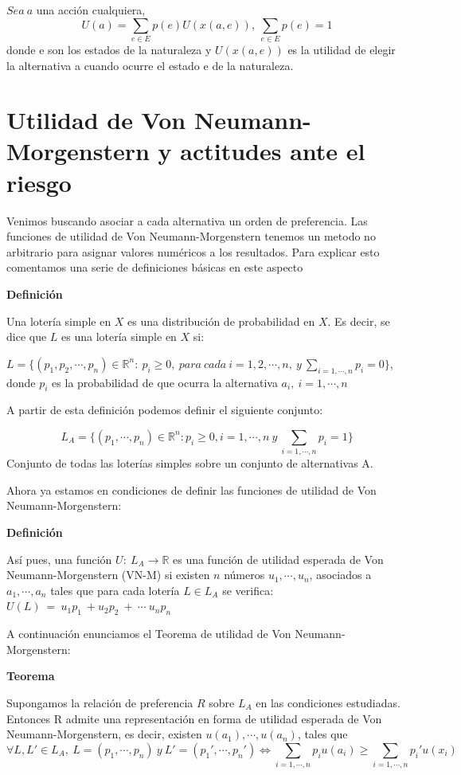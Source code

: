 \documentclass[12pt,a4paper,]{book}
\numberwithin{dummy}{section}
\theoremstyle{ocrenumbox}
\theoremstyle{blacknumex}
\theoremstyle{blacknumbox}
\theoremstyle{ocrenum}
\theoremstyle{ocrenum}
\begin{document}
\(Sea \ a\) una acción cualquiera,
\[U(a) = \sum_{e \in E} p(e)U(x(a,e)), \ \sum_{e \in E} p(e)=1\] donde e
son los estados de la naturaleza y \(U(x(a,e))\) es la utilidad de
elegir la alternativa a cuando ocurre el estado e de la naturaleza.

\hypertarget{Seccion14}{%
\section{Utilidad de Von Neumann-Morgenstern y actitudes ante el
riesgo}\label{Seccion14}}

Venimos buscando asociar a cada alternativa un orden de preferencia. Las
funciones de utilidad de Von Neumann-Morgenstern tenemos un metodo no
arbitrario para asignar valores numéricos a los resultados. Para
explicar esto comentamos una serie de definiciones básicas en este
aspecto

\textbf{Definición}

Una lotería simple en \(X\) es una distribución de probabilidad en
\(X\). Es decir, se dice que \(L\) es una lotería simple en \(X\) si:

\(L= \{(p_1,p_2, \cdots,p_n) \in \mathbb{R}^n: \ p_i \geq 0, \ para \ cada \ i=1,2,\cdots,n, \ y \ \sum_{i=1,\cdots,n} p_i=0 \}\),
donde \(p_i\) es la probabilidad de que ocurra la alternativa
\(a_i, \ i=1,\cdots,n\)

A partir de esta definición podemos definir el siguiente conjunto:

\[L_A = \{(p_1,\cdots,p_n) \in \mathbb{R}^n: p_i \geq 0, i=1,\cdots,n
\ y \ \sum_{i=1,\cdots,n} p_i=1 \}\] Conjunto de todas las loterías
simples sobre un conjunto de alternativas A.

Ahora ya estamos en condiciones de definir las funciones de utilidad de
Von Neumann-Morgenstern:

\textbf{Definición}

Así pues, una función \(U: \ L_A \rightarrow \mathbb{R}\) es una función
de utilidad esperada de Von Neumann-Morgenstern (VN-M) si existen \(n\)
números \(u_1, \cdots,u_n\), asociados a \(a_1, \cdots, a_n\) tales que
para cada lotería \(L \in L_A\) se verifica:
\(U(L) \ = \ u_1p_1 \ + u_2p_2 \ + \ \cdots \ u_np_n\)

A continuación enunciamos el Teorema de utilidad de Von
Neumann-Morgenstern:

\textbf{Teorema}

Supongamos la relación de preferencia \(R\) sobre \(L_A\) en las
condiciones estudiadas. Entonces R admite una representación en forma de
utilidad esperada de Von Neumann-Morgenstern, es decir, existen
\(u(a_1), \cdots, u(a_n)\), tales que\\
\[\forall L,L' \in L_A, \ L=(p_1,\cdots,p_n) \ y \ L'=(p_1', \cdots, p_n') \iff \sum_{i=1, \cdots, n} p_iu(a_i) \geq \sum_{i=1, \cdots, n} p_i'u(x_i)\]
\end{document}
